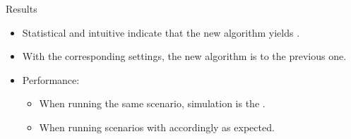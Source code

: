 
\begin{frame}[fragile]{Results}
  \begin{itemize}
    \item Statistical  and intuitive  indicate that the new algorithm yields . \checkmark
    \item With the corresponding settings, the new algorithm is  to the previous one. \checkmark
    \item Performance:
    \begin{itemize}
      \item When running the same scenario, simulation  is the . \checkmark
      \item When running scenarios with  accordingly as expected.
    \end{itemize}
  \end{itemize}
\end{frame}
